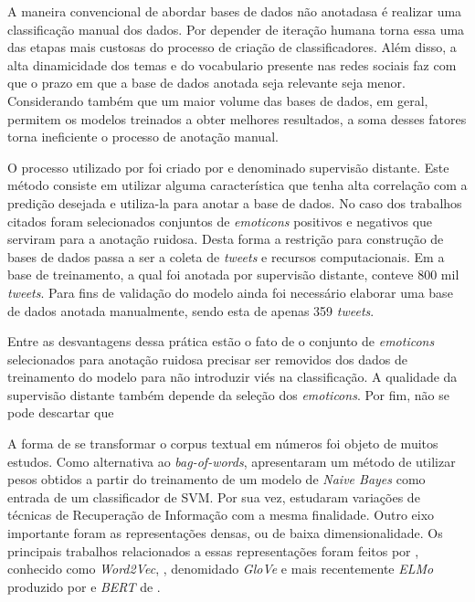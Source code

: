 A maneira convencional de abordar bases de dados não anotadasa é realizar uma
classificação manual dos dados.
Por depender de iteração humana torna essa uma das etapas mais custosas do
processo de criação de classificadores.
Além disso, a alta dinamicidade dos temas e do vocabulario presente nas redes
sociais faz com que o prazo em que a base de dados anotada seja relevante seja
menor.
Considerando também que um maior volume das bases de dados, em geral, permitem
os modelos treinados a obter melhores resultados, a soma desses fatores torna
ineficiente o processo de anotação manual.

O processo utilizado por \citet{go09} foi criado por \citet{read05} e denominado
supervisão distante.
Este método consiste em utilizar alguma característica que tenha alta correlação
com a predição desejada e utiliza-la para anotar a base de dados.
No caso dos trabalhos citados foram selecionados conjuntos de \textit{emoticons}
positivos e negativos que serviram para a anotação ruidosa.
Desta forma a restrição para construção de bases de dados passa a ser a coleta
de \textit{tweets} e recursos computacionais.
Em \citet{go09} a base de treinamento, a qual foi anotada por supervisão
distante, conteve 800 mil \textit{tweets}.
Para fins de validação do modelo ainda foi necessário elaborar uma base de
dados anotada manualmente, sendo esta de apenas 359 \textit{tweets}.

Entre as desvantagens dessa prática estão o fato de o conjunto de
\textit{emoticons} selecionados para anotação ruidosa precisar ser removidos dos
dados de treinamento do modelo para não introduzir viés na classificação.
A qualidade da supervisão distante também depende da seleção dos
\textit{emoticons}.
Por fim, não se pode descartar que


A forma de se transformar o corpus textual em números foi objeto de muitos
estudos.
Como alternativa ao \textit{bag-of-words}, \citet{wang12} apresentaram um método
de utilizar pesos obtidos a partir do treinamento de um modelo de
\textit{Naive Bayes} como entrada de um classificador de SVM.
Por sua vez, \citet{paltoglou10} estudaram variações de técnicas de Recuperação
de Informação com a mesma finalidade.
Outro eixo importante foram as representações densas, ou de baixa
dimensionalidade.
Os principais trabalhos relacionados a essas representações foram feitos por
\citet{mikolov13}, conhecido como \textit{Word2Vec}, \citet{pennington14},
denomidado \textit{GloVe} e mais recentemente \textit{ELMo} produzido por
\citet{peters18} e \textit{BERT} de \citet{devlin18}.

